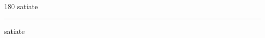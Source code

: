 
\begin{frame}
\begin{center}
\begin{turn}{180}
{\fontsize{2.5cm}{1em}\selectfont satiate}
\end{turn}
\vspace{1em}\par  
\hrule
\vspace{1em}\par  
{\fontsize{2.5cm}{1em}\selectfont satiate}
\end{center}
\end{frame}
